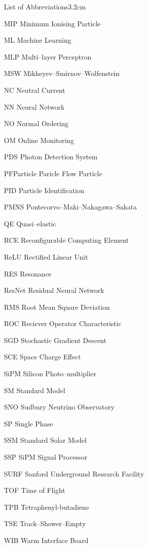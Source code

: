 \begin{mclistof}{List of Abbreviations}{3.2cm}
	\item [ MIP        ] {Minimum Ionising Particle}
	\item [ ML         ] {Machine Learning}
	\item [ MLP        ] {Multi--layer Perceptron}
	\item [ MSW        ] {Mikheyev--Smirnov--Wolfenstein}
	\item [ NC         ] {Neutral Current}
	\item [ NN         ] {Neural Network}
	\item [ NO         ] {Normal Ordering}
	\item [ OM         ] {Online Monitoring}
	\item [ PDS        ] {Photon Detection System}
	\item [ PFParticle ] {Paricle Flow Particle}
	\item [ PID        ] {Particle Identification}
	\item [ PMNS       ] {Pontecorvo--Maki--Nakagawa--Sakata}
	\item [ QE         ] {Quasi--elastic}
	\item [ RCE        ] {Reconfigurable Computing Element}
	\item [ ReLU       ] {Rectified Linear Unit}
	\item [ RES        ] {Resonance}
	\item [ ResNet     ] {Residual Neural Network}
	\item [ RMS        ] {Root Mean Square Deviation}
	\item [ ROC        ] {Reciever Operator Characteristic}
	\item [ SGD        ] {Stochastic Gradient Descent}
	\item [ SCE        ] {Space Charge Effect}
	\item [ SiPM       ] {Silicon Photo--multiplier}
	\item [ SM         ] {Standard Model}
	\item [ SNO        ] {Sudbury Neutrino Observatory}
	\item [ SP         ] {Single Phase}
	\item [ SSM        ] {Standard Solar Model}
	\item [ SSP        ] {SiPM Signal Processor}
	\item [ SURF       ] {Sanford Underground Research Facility}
	\item [ TOF        ] {Time of Flight}
	\item [ TPB        ] {Tetraphenyl-butadiene}
	\item [ TSE        ] {Track--Shower--Empty}
	\item [ WIB        ] {Warm Interface Board}
\end{mclistof} 
